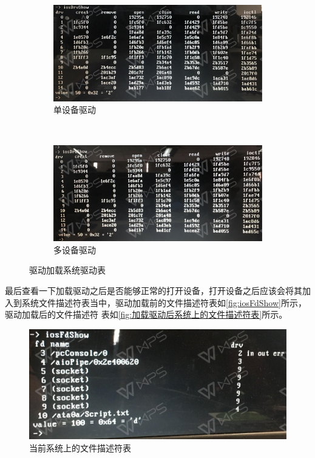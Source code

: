 \begin{figure}[h]
\centering
  \begin{subfigure}[b]{0.7\textwidth}
  \includegraphics[width=\textwidth]{./graphics/iosDrvShowS.pdf}
  \caption{单设备驱动}
  \end{subfigure}
  ~
  \begin{subfigure}[b]{0.7\textwidth}
  \includegraphics[width=\textwidth]{./graphics/iosDrvShowM.pdf}
  \caption{多设备驱动}
  \end{subfigure}
\caption{驱动加载系统驱动表}\label{fig:加载驱动后系统上的驱动表}
\end{figure}

\noindent 最后查看一下加载驱动之后是否能够正常的打开设备，打开设备之后应该会将其加入到系统文件描述符表当中，驱动加载前的文件描述符表如\autoref{fig:iosFdShow}所示，驱动加载后的文件描述符 表如\autoref{fig:加载驱动后系统上的文件描述符表}所示。
\begin{figure}[!h]
\centering
\includegraphics[width=.9\textwidth]{./graphics/iosFdShow.pdf}
\caption{当前系统上的文件描述符表}\label{fig:iosFdShow}
\end{figure}

